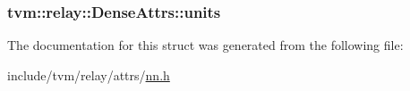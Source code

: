 \subsubsection[{\texorpdfstring{units}{units}}]{ tvm\+::relay\+::\+Dense\+Attrs\+::units}\hypertarget{structtvm_1_1relay_1_1DenseAttrs_a497487f7ccced8c7492a5ed03f78fa8f}{}\label{structtvm_1_1relay_1_1DenseAttrs_a497487f7ccced8c7492a5ed03f78fa8f}


The documentation for this struct was generated from the following file\+:\begin{DoxyCompactItemize}
\item 
include/tvm/relay/attrs/\hyperlink{include_2tvm_2relay_2attrs_2nn_8h}{nn.\+h}\end{DoxyCompactItemize}

